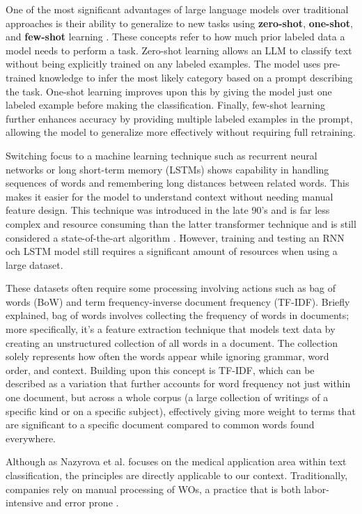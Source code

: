 One of the most significant advantages of large language models over traditional approaches is their ability to generalize to new tasks using \textbf{zero-shot}, \textbf{one-shot}, and \textbf{few-shot} learning \cite{brown2020language}. These concepts refer to how much prior labeled data a model needs to perform a task. Zero-shot learning allows an LLM to classify text without being explicitly trained on any labeled examples. The model uses pre-trained knowledge to infer the most likely category based on a prompt describing the task. One-shot learning improves upon this by giving the model just one labeled example before making the classification. Finally, few-shot learning further enhances accuracy by providing multiple labeled examples in the prompt, allowing the model to generalize more effectively without requiring full retraining.

Switching focus to a machine learning technique such as recurrent neural networks or long short-term memory (LSTMs) shows capability in handling sequences of words and remembering long distances between related words. This makes it easier for the model to understand context without needing manual feature design. This technique was introduced in the late 90's and is far less complex and resource consuming than the latter transformer technique and is still considered a state-of-the-art algorithm \cite{wang2024classifiers, hochreiter1997long}. However, training and testing an RNN och LSTM model still requires a significant amount of resources when using a large dataset.

These datasets often require some processing involving actions such as bag of words (BoW) and term frequency-inverse document frequency (TF-IDF). Briefly explained, \cite{murel2024bagofwords} bag of words involves collecting the frequency of words in documents; more specifically, it's a feature extraction technique that models text data by creating an unstructured collection of all words in a document. The collection solely represents how often the words appear while ignoring grammar, word order, and context. Building upon this concept is TF-IDF, which can be described as a variation that further accounts for word frequency not just within one document, but across a whole corpus (a large collection of writings of a specific kind or on a specific subject), effectively giving more weight to terms that are significant to a specific document compared to common words found everywhere.

Although as Nazyrova et al. \cite{nazyrova2024medical} focuses on the medical application area within text classification, the principles are directly applicable to our context.  Traditionally, companies rely on manual processing of WOs, a practice that is both labor-intensive and error prone \cite{li2024work}.

